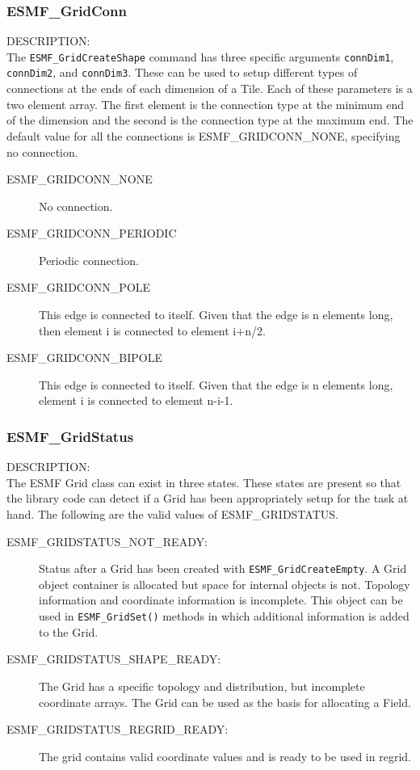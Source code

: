 
\subsubsection{ESMF\_GridConn}
\label{sec:opt:gridconn}
{\sf DESCRIPTION:\\}
The {\tt ESMF\_GridCreateShape} command has three specific arguments
{\tt connDim1}, {\tt connDim2}, and {\tt connDim3}. These can be used
to setup different types of connections at the ends of each dimension
of a Tile.  Each of these parameters is a two element array. The first
element is the connection type at the minimum end of the dimension
and the second is the connection type at the maximum end. The default
value for all the connections is ESMF\_GRIDCONN\_NONE, specifying no
connection.

\medskip
\begin{description}
\item [ESMF\_GRIDCONN\_NONE] No connection.

\item [ESMF\_GRIDCONN\_PERIODIC] Periodic connection.

\item [ESMF\_GRIDCONN\_POLE] This edge is connected to itself. Given
that the edge is n elements long, then element i is connected to
element i+n/2.

\item [ESMF\_GRIDCONN\_BIPOLE] This edge is connected to itself. Given
that the edge is n elements long, element i is connected to element n-i-1.

\end{description}

\subsubsection{ESMF\_GridStatus}
\label{sec:opt:gridstatus}

{\sf DESCRIPTION:\\}
The ESMF Grid class can exist in three states. These states are
present so that the library code can detect if a Grid has been
appropriately setup for the task at hand. The following
are the valid values of ESMF\_GRIDSTATUS.

\medskip
\begin{description}
\item [ESMF\_GRIDSTATUS\_NOT\_READY:] Status after a Grid has been created with 
      {\tt ESMF\_GridCreateEmpty}.  A Grid object container is allocated but
      space for internal objects is not.  Topology information and coordinate
      information is incomplete.  This object can be used in {\tt ESMF\_GridSet()}
      methods in which additional information is added to the Grid.
\item [ESMF\_GRIDSTATUS\_SHAPE\_READY:] The Grid has a specific topology and
      distribution, but incomplete coordinate arrays.  The Grid can be used
      as the basis for allocating a Field.
\item [ESMF\_GRIDSTATUS\_REGRID\_READY:] The grid contains valid coordinate
      values and is ready to be used in regrid. 
\end{description}


